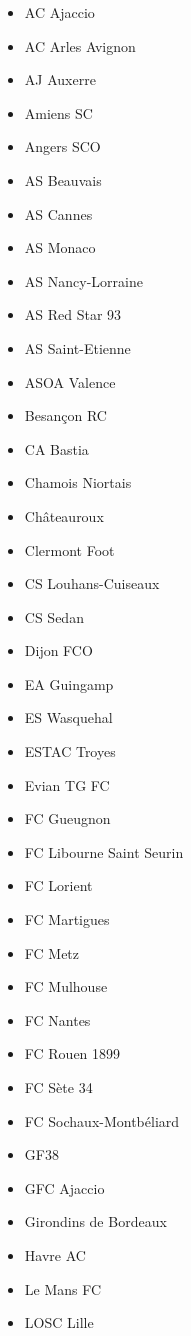 \begin{multicols}{2}
	\begin{itemize}
	    \setlength{\itemsep}{1pt}
	    \setlength{\parskip}{0pt}
	    \setlength{\parsep}{0pt}
		\item AC Ajaccio
		\item AC Arles Avignon
		\item AJ Auxerre
		\item Amiens SC
		\item Angers SCO
		\item AS Beauvais
		\item AS Cannes
		\item AS Monaco
		\item AS Nancy-Lorraine
		\item AS Red Star 93
		\item AS Saint-Etienne
		\item ASOA Valence
		\item Besançon RC
		\item CA Bastia
		\item Chamois Niortais
		\item Châteauroux
		\item Clermont Foot
		\item CS Louhans-Cuiseaux
		\item CS Sedan
		\item Dijon FCO
		\item EA Guingamp
		\item ES Wasquehal
		\item ESTAC Troyes
		\item Evian TG FC
		\item FC Gueugnon
		\item FC Libourne Saint Seurin
		\item FC Lorient
		\item FC Martigues
		\item FC Metz
		\item FC Mulhouse
		\item FC Nantes
		\item FC Rouen 1899
		\item FC Sète 34
		\item FC Sochaux-Montbéliard
		\item GF38
		\item GFC Ajaccio
		\item Girondins de Bordeaux
		\item Havre AC
		\item Le Mans FC
		\item LOSC Lille

\end{itemize}
\end{multicols}
